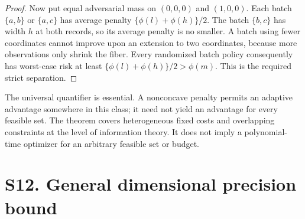 \begin{proof}
Now put equal adversarial mass on $(0,0,0)$ and $(1,0,0)$.
Each batch $\{a,b\}$ or $\{a,c\}$ has average penalty
$\{\phi(l)+\phi(h)\}/2$. The batch $\{b,c\}$ has width $h$ at both
records, so its average penalty is no smaller. A batch using fewer
coordinates cannot improve upon an extension to two coordinates,
because more observations only shrink the fiber. Every randomized
batch policy consequently has worst-case risk at least
$\{\phi(l)+\phi(h)\}/2>\phi(m)$. This is the required strict separation.
\end{proof}

The universal quantifier is essential. A nonconcave penalty permits an
adaptive advantage somewhere in this class; it need not yield an
advantage for every feasible set. The theorem covers heterogeneous fixed
costs and overlapping constraints at the level of information theory.
It does not imply a polynomial-time optimizer for an arbitrary feasible
set or budget.

\section{S12. General dimensional precision bound}
